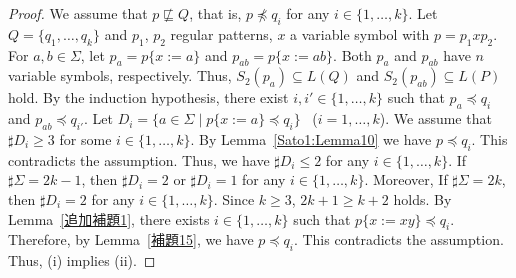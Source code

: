 \begin{proof}
    We assume that $p \not\sqsubseteq Q$, that is, $p \not\preceq q_{i}$
    for any $i \in \{1,\ldots,k\}$.
    Let $Q = \{q_{1},\ldots,q_{k}\}$ and
    $p_{1}$, $p_{2}$ regular patterns, $x$ a variable symbol with
    $p = p_{1}xp_{2}$.
    For $a, b \in \Sigma$,
    let $p_{a}=p\{x:=a\}$ and $p_{ab}=p\{x:=ab\}$.
    Both $p_{a}$ and $p_{ab}$ have $n$ variable symbols, respectively.
    Thus, $S_{2}(p_{a}) \subseteq L(Q)$ and $S_{2}(p_{ab}) \subseteq L(P)$ hold.
    By the induction hypothesis,
    there exist $i, i' \in \{1,\ldots,k\}$ such that
    $p_{a} \preceq q_{i}$ and $p_{ab} \preceq q_{i'}$.
    Let $D_{i} = \{a \in \Sigma \mid p\{x:=a\} \preceq q_{i}\}$ \ ($i=1,\ldots,k$).
    We assume that $\sharp D_{i} \geq 3$ for some $i \in \{1,\ldots, k\}$.
    By Lemma~\ref{Sato1:Lemma10}%
    we have $p \preceq q_{i}$.
    This contradicts the assumption.
    Thus, we have $\sharp D_{i} \leq 2$ for any $i \in \{1,\ldots,k\}$.
    If $\sharp\Sigma = 2k-1$, then
    $\sharp D_{i}=2$ or $\sharp D_{i}=1$ for any $i \in \{1,\ldots,k\}$.
    Moreover,
    If $\sharp\Sigma = 2k$, then
    $\sharp D_{i}=2$ for any $i \in \{1,\ldots,k\}$.
    Since $k \geq 3$, $2k+1 \geq k+2$ holds.
    By Lemma~\ref{追加補題1},
    there exists $i \in \{1,\ldots,k\}$ such that $p\{x:=xy\} \preceq q_{i}$.
    Therefore, by Lemma~\ref{補題15}, we have $p \preceq q_{i}$.
    This contradicts the assumption.
    Thus, (i) implies (ii).
\end{proof}

